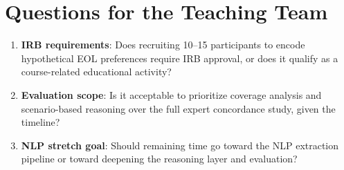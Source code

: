 \documentclass[11pt]{article}
\begin{document}
\section{Questions for the Teaching Team}

\begin{enumerate}[nosep]
    \item \textbf{IRB requirements}: Does recruiting 10--15 participants to encode hypothetical EOL preferences require IRB approval, or does it qualify as a course-related educational activity?
    \item \textbf{Evaluation scope}: Is it acceptable to prioritize coverage analysis and scenario-based reasoning over the full expert concordance study, given the timeline?
    \item \textbf{NLP stretch goal}: Should remaining time go toward the NLP extraction pipeline or toward deepening the reasoning layer and evaluation?
\end{enumerate}
\end{document}
